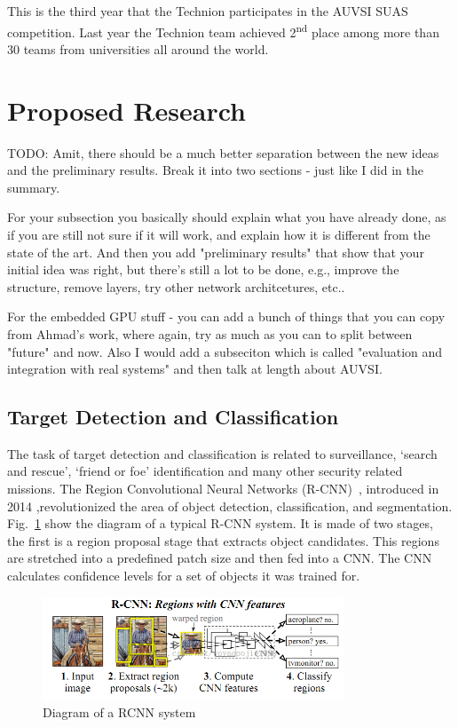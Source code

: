 \documentclass{article} %
\begin{document}
This is the third year that the Technion participates in the AUVSI SUAS
competition. Last year the Technion team achieved 2\textsuperscript{nd} place
among more than 30 teams from universities all around the world.

\section{Proposed Research}

TODO: Amit, there should be a much better separation between the new ideas and
the preliminary results. Break it into two sections - just like I did in the
summary. 

For your subsection you basically should explain what you have already
done, as if you are still not sure if it will work, and explain how it is
different from the state of the art. And then you add "preliminary results" that
show that your initial idea was right, but there's still a lot to be done, e.g.,
improve the structure, remove layers, try other network architcetures, etc..

For the embedded GPU stuff - you can add a bunch of things that you can copy
from Ahmad's work, where again, try as much as you can to split between "future"
and now. Also I would add a subseciton which is called "evaluation and
integration with real systems" and then talk at length about AUVSI. 



\subsection{Target Detection and Classification}

The task of target detection and classification is related
to surveillance, `search and rescue', `friend or foe' identification and many other security related missions. 
The Region Convolutional Neural Networks
(R-CNN)~\cite{Girshick2014}, introduced in 2014 ,revolutionized the area of object detection, classification, and segmentation.
Fig.~\ref{fig:RCNN} show the diagram of a typical
R-CNN system. It is made of two stages, the first is a region proposal stage that extracts
object candidates. This regions are stretched into a predefined patch size and then
fed into a CNN. The CNN calculates confidence levels for a set of objects it was trained
for.
\begin{figure}[h]
	\centering
	\includegraphics[width=0.8\textwidth]{RCNN}
	\caption{Diagram of a RCNN system}
	\label{fig:RCNN}
\end{figure}
\end{document}
